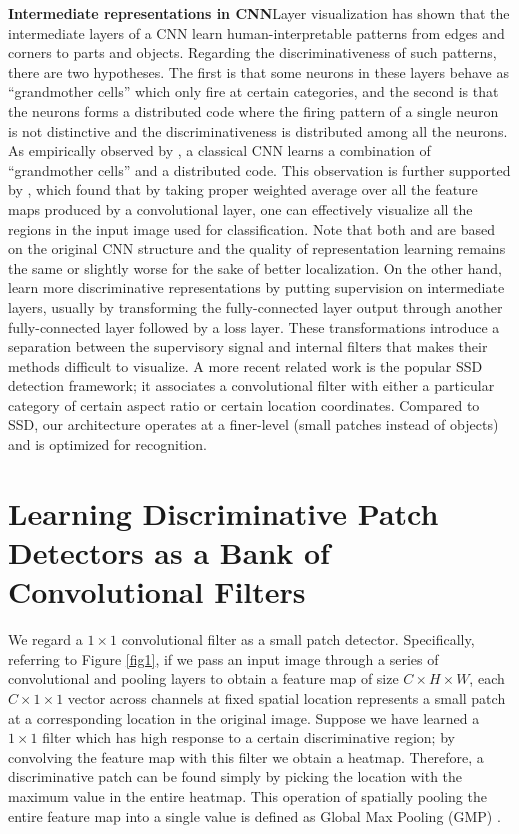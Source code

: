 \documentclass[10pt,twocolumn,letterpaper]{article}
\begin{document}
\noindent\textbf{Intermediate representations in CNN}\quad Layer visualization \cite{fergus14} has shown that the
intermediate layers of a CNN
learn human-interpretable patterns from edges and corners to parts and objects. Regarding the discriminativeness of such
patterns, there are two hypotheses. The first is that some neurons in these layers behave as ``grandmother cells''
which only fire at certain categories, and the second is that the neurons forms a distributed code where the firing
pattern of a single neuron is not distinctive and the discriminativeness is distributed among all the neurons. As
empirically observed by \cite{grandmacell}, a classical CNN learns a combination of ``grandmother cells'' and a
distributed code. This observation is further supported by \cite{bolei}, which found that by taking proper weighted
average over all the feature maps produced by a convolutional layer, one can effectively visualize all the regions
in the input image used for classification. Note that both \cite{grandmacell} and \cite{bolei} are based on the original CNN
structure and the quality of representation learning remains the same or slightly worse for the sake of better
localization. On the other hand, \cite{dsn, lcnn, cite_lcnn} learn more discriminative representations by putting 
supervision on intermediate layers, usually by transforming the fully-connected layer output through another fully-connected layer followed by
a loss layer. These transformations introduce a separation between the supervisory signal and internal filters that makes
their methods difficult to
visualize. A more recent related work is the popular SSD \cite{ssd} detection framework; it associates a
convolutional filter with either a particular category of certain aspect ratio or certain location coordinates. Compared
to SSD, our architecture operates at a finer-level (small patches instead of objects) and is optimized for recognition.

\section{Learning Discriminative Patch Detectors as a Bank of Convolutional Filters} \label{sec3}
We regard a $1\times1$ convolutional
filter as a small patch detector. Specifically, referring to Figure \ref{fig1}, if we pass an input
image through a series of convolutional and pooling layers to obtain a feature map of size $C\times H\times W$, 
each $C \times 1 \times 1$ vector across channels at fixed spatial location represents a small
patch at a corresponding location in the original image. Suppose we have learned a $1\times1$ filter which has high
response to a certain discriminative region; by convolving the feature map with this filter we obtain a heatmap.
Therefore, a
discriminative patch can be found simply by picking the location with the maximum value in the entire heatmap. This operation of
spatially pooling the entire feature map into a single value is defined as Global Max Pooling (GMP) \cite{bolei}.
\end{document}
